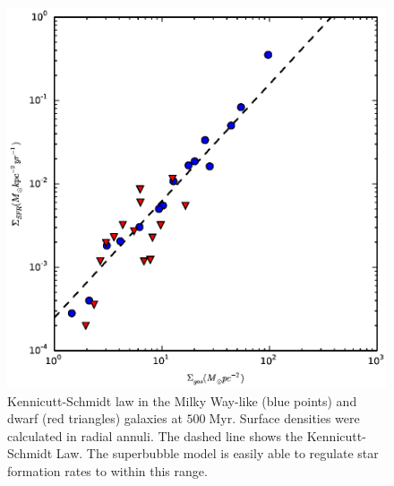 \begin{figure}
    \includegraphics[width=\textwidth]{figures1/kennicutt_schmidt.eps}
    \caption[Kennicutt-Schmidt law for isolated galaxies]{Kennicutt-Schmidt law
    in the Milky Way-like (blue points) and dwarf (red triangles) galaxies at
    $500\;\mathrm{Myr}$. Surface densities were calculated in radial annuli.
    The dashed line shows the Kennicutt-Schmidt Law.  The superbubble model is
    easily able to regulate star formation rates to within this range.}
    \label{kennicutt_schmidt}
\end{figure}

